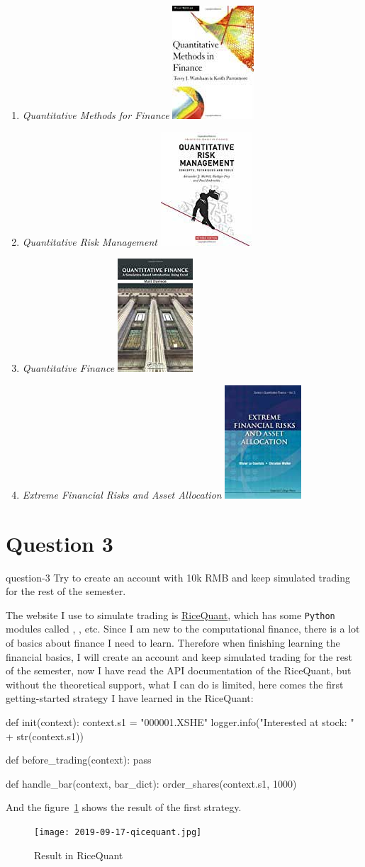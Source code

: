 \begin{enumerate}
    \item \emph{Quantitative Methods for Finance}
        \hfill\includegraphics[height=.5in]{figures/2019-09-17-finance-books-7.jpg}
    \item \emph{Quantitative Risk Management}
        \hfill\includegraphics[height=.5in]{figures/2019-09-17-finance-books-8.jpg}
    \item \emph{Quantitative Finance}
        \hfill\includegraphics[height=.5in]{figures/2019-09-17-finance-books-9.jpg}
    \item \emph{Extreme Financial Risks and Asset Allocation}
        \hfill\includegraphics[height=.5in]{figures/2019-09-17-finance-books-10.jpg}
\end{enumerate}



\section{Question 3}
\begin{statebox}{}{question-3}
    Try to create an account with 10k RMB and keep simulated trading for the rest of the semester.
\end{statebox}
The website I use to simulate trading is \href{https://www.ricequant.com/quant/}{RiceQuant}, which has some \texttt{Python} modules called , , etc. Since I am new to the computational finance, there is a lot of basics about finance I need to learn. Therefore when finishing learning the financial basics, I will create an account and keep simulated trading for the rest of the semester, now I have read the API documentation of the RiceQuant, but without the theoretical support, what I can do is limited, here comes the first getting-started strategy I have learned in the RiceQuant:
\begin{pylist}
def init(context):
    context.s1 = "000001.XSHE"
    logger.info("Interested at stock: " + str(context.s1))

def before_trading(context):
    pass

def handle_bar(context, bar_dict):
    order_shares(context.s1, 1000)
\end{pylist}\label{C:rice-quant-getting-started}

And the figure~\ref{F:ricequant-getting-started} shows the result of the first strategy.
\begin{figure}
    \centering
    \texttt{[image: 2019-09-17-qicequant.jpg]}
    \caption{Result in RiceQuant}\label{F:ricequant-getting-started}
\end{figure}




